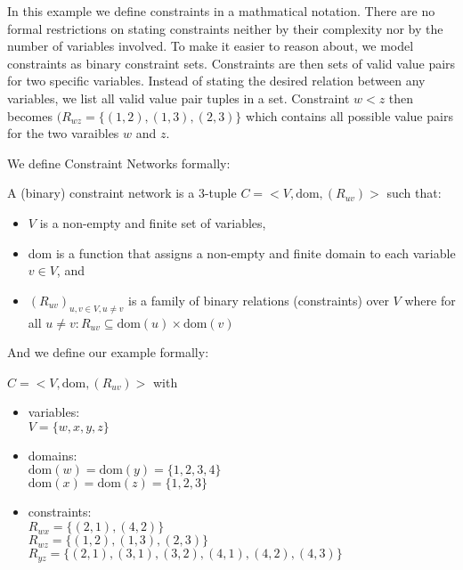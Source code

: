 In this example we define constraints in a mathmatical notation. There are no formal restrictions on stating constraints neither by their complexity nor by the number of variables involved. To make it easier to reason about, we model constraints as binary constraint sets. Constraints are then sets of valid value pairs for two specific variables. Instead of stating the desired relation between any variables, we list all valid value pair tuples in a set. Constraint $w < z$ then becomes $(R_{wz} = \{(1, 2), (1, 3), (2, 3)\}$ which contains all possible value pairs for the two varaibles $w$ and $z$.

We define Constraint Networks formally:

\begin{tcolorbox}
	A (binary) constraint network is a 3-tuple $C = <V, \text{dom}, (R_{uv})>$ such that:
	\begin{itemize}
		\item $V$ is a non-empty and finite set of variables,
		\item dom is a function that assigns a non-empty and finite domain to each variable $v \in V$, and
		\item $(R_{uv})_{u,v \in V, u \neq v}$ is a family of binary relations (constraints) over $V$ where for all $u \neq v: R_{uv} \subseteq \text{dom}(u) \times \text{dom}(v)$
	\end{itemize}
\end{tcolorbox}

And we define our example formally:

\begin{tcolorbox}
	$C = <V, \text{dom}, (R_{uv})>$ with
	\begin{itemize}
		\item variables: \\
		      $V = \{w, x, y, z\}$
		\item domains: \\
		      $\text{dom}(w) = \text{dom}(y) = \{1, 2, 3, 4\}$ \\
		      $\text{dom}(x) = \text{dom}(z) = \{1, 2, 3\}$
		\item constraints: \\
		      $R_{wx} = \{(2, 1), (4, 2)\}$ \\
		      $R_{wz} = \{(1, 2), (1, 3), (2, 3)\}$ \\
		      $R_{yz} = \{(2, 1), (3, 1), (3, 2), (4, 1), (4, 2), (4, 3)\}$ \\
	\end{itemize}
\end{tcolorbox}

